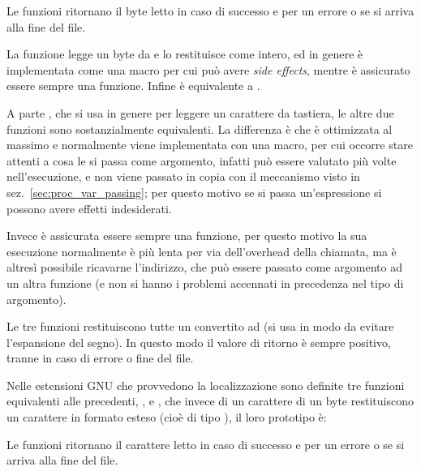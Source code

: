 \begin{funcproto}{
}

{Le funzioni ritornano il byte letto in caso di successo e  per un
  errore o se si arriva alla fine del file.}  
\end{funcproto}

La funzione  legge un byte da  e lo restituisce come
intero, ed in genere è implementata come una macro per cui può avere
\textit{side effects}, mentre  è assicurato essere sempre una
funzione. Infine  è equivalente a .

A parte , che si usa in genere per leggere un carattere da
tastiera, le altre due funzioni sono sostanzialmente equivalenti. La
differenza è che  è ottimizzata al massimo e normalmente
viene implementata con una macro, per cui occorre stare attenti a cosa
le si passa come argomento, infatti  può essere valutato
più volte nell'esecuzione, e non viene passato in copia con il
meccanismo visto in sez.~\ref{sec:proc_var_passing}; per questo motivo se
si passa un'espressione si possono avere effetti indesiderati.

Invece  è assicurata essere sempre una funzione, per questo motivo
la sua esecuzione normalmente è più lenta per via dell'overhead della
chiamata, ma è altresì possibile ricavarne l'indirizzo, che può essere passato
come argomento ad un altra funzione (e non si hanno i problemi accennati in
precedenza nel tipo di argomento).

Le tre funzioni restituiscono tutte un  convertito
ad  (si usa  in modo da evitare
l'espansione del segno). In questo modo il valore di ritorno è sempre
positivo, tranne in caso di errore o fine del file.

Nelle estensioni GNU che provvedono la localizzazione sono definite tre
funzioni equivalenti alle precedenti, ,  e
, che invece di un carattere di un byte restituiscono un
carattere in formato esteso (cioè di tipo ), il loro prototipo
è:

\begin{funcproto}{
}

{Le funzioni ritornano il carattere letto in caso di successo e  per
  un errore o se si arriva alla fine del file.}  
\end{funcproto}

